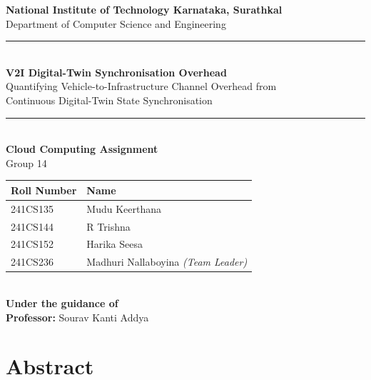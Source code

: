 \documentclass[12pt, a4paper]{article}
\begin{document}
\begin{titlepage}
    \centering
    \vspace*{1cm}

    {\Large \textbf{National Institute of Technology Karnataka, Surathkal}}\\[0.3cm]
    {\large Department of Computer Science and Engineering}\\[1.5cm]

    \rule{\textwidth}{1.5pt}\\[0.5cm]
    {\LARGE \textbf{V2I Digital-Twin Synchronisation Overhead}}\\[0.2cm]
    {\large Quantifying Vehicle-to-Infrastructure Channel Overhead from\\
    Continuous Digital-Twin State Synchronisation}\\[0.3cm]
    \rule{\textwidth}{1.5pt}\\[1.5cm]

    {\large \textbf{Cloud Computing Assignment}}\\[0.3cm]
    {\large Group 14}\\[2cm]

    \begin{tabular}{ll}
        \toprule
        \textbf{Roll Number} & \textbf{Name} \\
        \midrule
        241CS135 & Mudu Keerthana \\
        241CS144 & R Trishna \\
        241CS152 & Harika Seesa \\
        241CS236 & Madhuri Nallaboyina \textit{(Team Leader)} \\
        \bottomrule
    \end{tabular}\\[2cm]

    {\large \textbf{Under the guidance of}}\\[0.3cm]
    {\large \textbf{Professor:} Sourav Kanti Addya}\\[1.5cm]

\end{titlepage}

\newpage
\tableofcontents
\newpage

\section{Abstract}
\end{document}
